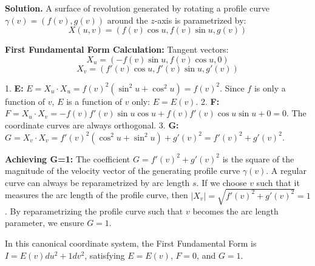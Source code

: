 \documentclass[12pt, a4paper, oneside]{article}
\newenvironment{solution}
  {\par\noindent\textbf{Solution. }\newline}
  {\par}
\begin{document}
\begin{solution}
A surface of revolution generated by rotating a profile curve $\gamma(v) = (f(v), g(v))$ around the $z$-axis is parametrized by:
$$X(u, v) = (f(v) \cos u, f(v) \sin u, g(v))$$

\textbf{First Fundamental Form Calculation:}
Tangent vectors:
$$X_u = (-f(v) \sin u, f(v) \cos u, 0)$$
$$X_v = (f'(v) \cos u, f'(v) \sin u, g'(v))$$

1.  \textbf{E:} $E = X_u \cdot X_u = f(v)^2 (\sin^2 u + \cos^2 u) = f(v)^2$. Since $f$ is only a function of $v$, $E$ is a function of $v$ only: $E = E(v)$.
2.  \textbf{F:} $F = X_u \cdot X_v = -f(v)f'(v) \sin u \cos u + f(v)f'(v) \cos u \sin u + 0 = 0$. The coordinate curves are always orthogonal.
3.  \textbf{G:} $G = X_v \cdot X_v = f'(v)^2 (\cos^2 u + \sin^2 u) + g'(v)^2 = f'(v)^2 + g'(v)^2$.

\textbf{Achieving G=1:}
The coefficient $G = f'(v)^2 + g'(v)^2$ is the square of the magnitude of the velocity vector of the generating profile curve $\gamma(v)$.
A regular curve can always be reparametrized by arc length $s$. If we choose $v$ such that it measures the arc length of the profile curve, then $|X_v| = \sqrt{f'(v)^2 + g'(v)^2} = 1$.
By reparametrizing the profile curve such that $v$ becomes the arc length parameter, we ensure $G=1$.

In this canonical coordinate system, the First Fundamental Form is $I = E(v) du^2 + 1 dv^2$, satisfying $E=E(v)$, $F=0$, and $G=1$.
\end{solution}
\end{document}
